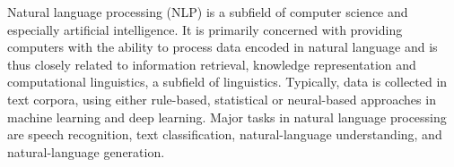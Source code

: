 Natural language processing (NLP) is a subfield of computer science and especially artificial intelligence. It is primarily concerned with providing computers with the ability to process data encoded in natural language and is thus closely related to information retrieval, knowledge representation and computational linguistics, a subfield of linguistics. Typically, data is collected in text corpora, using either rule-based, statistical or neural-based approaches in machine learning and deep learning. Major tasks in natural language processing are speech recognition, text classification, natural-language understanding, and natural-language generation.
